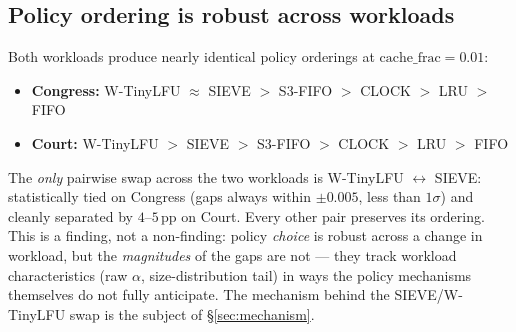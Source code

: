 \subsection*{Policy ordering is robust across workloads}

Both workloads produce nearly identical policy orderings at
$\mathrm{cache\_frac}=0.01$:

\begin{itemize}[leftmargin=*,itemsep=0pt,topsep=2pt]
  \item \textbf{Congress:} W-TinyLFU $\approx$ SIEVE $>$ S3-FIFO $>$ CLOCK $>$ LRU $>$ FIFO
  \item \textbf{Court:} W-TinyLFU $>$ SIEVE $>$ S3-FIFO $>$ CLOCK $>$ LRU $>$ FIFO
\end{itemize}

The \emph{only} pairwise swap across the two workloads is W-TinyLFU
$\leftrightarrow$ SIEVE: statistically tied on Congress (gaps always within
$\pm 0.005$, less than $1\sigma$) and cleanly separated by $4$--$5$\,pp on
Court. Every other pair preserves its ordering. This is a finding, not a
non-finding: policy \emph{choice} is robust across a change in workload, but
the \emph{magnitudes} of the gaps are not --- they track workload
characteristics (raw $\alpha$, size-distribution tail) in ways the policy
mechanisms themselves do not fully anticipate. The mechanism behind the
SIEVE/W-TinyLFU swap is the subject of \S\ref{sec:mechanism}.
